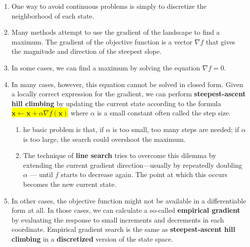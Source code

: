 \begin{enumerate}
    \item One way to avoid continuous problems is simply to discretize the neighborhood of each state.
    \hfill \cite{ai/book/Artificial-Intelligence-A-Modern-Approach/Russell-Norvig}

    \item Many methods attempt to use the gradient of the landscape to find a maximum. 
    The gradient of the objective function is a vector $\nabla f$ that gives the magnitude and direction of the steepest slope.
    \hfill \cite{ai/book/Artificial-Intelligence-A-Modern-Approach/Russell-Norvig}

    \item In some cases, we can find a maximum by solving the equation $\nabla f = 0$. 
    \hfill \cite{ai/book/Artificial-Intelligence-A-Modern-Approach/Russell-Norvig}

    \item In many cases, however, this equation cannot be solved in closed form.
    Given a locally correct expression for the gradient, we can perform \textbf{steepest-ascent hill climbing} by updating the current state according to the formula \colorbox{yellow}{$\bm{x} \gets \bm{x} + \alpha \nabla f(\bm{x})$} where $\alpha$ is a small constant often called the step size. 
    \hfill \cite{ai/book/Artificial-Intelligence-A-Modern-Approach/Russell-Norvig}
    \begin{enumerate}
        \item he basic problem is that, if $\alpha$ is too small, too many steps are needed; if $\alpha$ is too large, the search could overshoot the maximum. 
        \hfill \cite{ai/book/Artificial-Intelligence-A-Modern-Approach/Russell-Norvig}

        \item The technique of \textbf{line search} tries to overcome this dilemma by extending the current gradient direction—usually by repeatedly doubling $\alpha$ — until $f$ starts to decrease again.
        The point at which this occurs becomes the new current state.
        \hfill \cite{ai/book/Artificial-Intelligence-A-Modern-Approach/Russell-Norvig}
    \end{enumerate}

    \item In other cases, the objective function might not be available in a differentiable form at all. 
    In those cases, we can calculate a so-called \textbf{empirical gradient} by evaluating the response to small increments and decrements in each coordinate. 
    Empirical gradient search is the same as \textbf{steepest-ascent hill climbing} in a \textbf{discretized} version of the state space.
    \hfill \cite{ai/book/Artificial-Intelligence-A-Modern-Approach/Russell-Norvig}


\end{enumerate}
